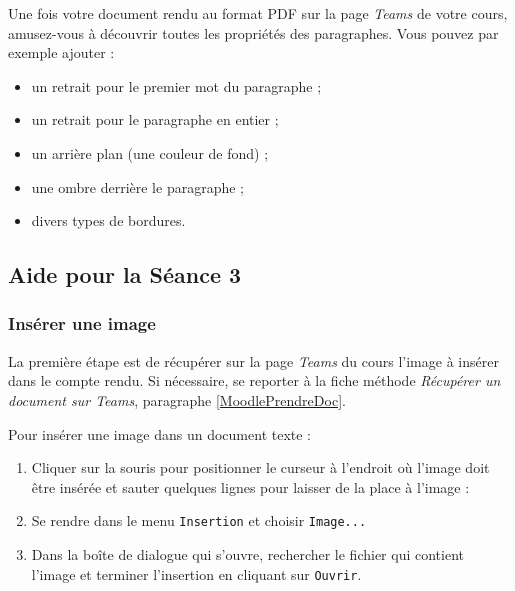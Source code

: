 {Une fois votre document rendu au format PDF sur la page \emph{Teams} de votre cours, amusez-vous à découvrir toutes les propriétés des paragraphes. Vous pouvez par exemple ajouter :
\begin{itemize}
\item un retrait pour le premier mot du paragraphe ;
\item un retrait pour le paragraphe en entier ; 
\item un arrière plan (une couleur de fond) ;
\item une ombre derrière le paragraphe ; 
\item divers types de bordures. 
\end{itemize}


%
%
%
%


\subsection{Aide pour la Séance 3}\label{correction_texte03}



\subsubsection{Insérer une image}

La première étape est de récupérer sur la page \emph{Teams} du cours l'image à insérer dans le compte rendu. Si nécessaire, se reporter à la fiche méthode \emph{Récupérer un document sur Teams}, paragraphe \vref{MoodlePrendreDoc}.

\vspace{12pt}

Pour insérer une image dans un document texte :

\begin{enumerate}
\item Cliquer sur la souris pour positionner le curseur à l'endroit où l'image doit être insérée et sauter quelques lignes pour laisser de la place à l'image :


\item Se rendre dans le menu \texttt{Insertion} et choisir \texttt{Image...}


\item Dans la boîte de dialogue qui s'ouvre, rechercher le fichier qui contient l'image et terminer l'insertion en cliquant sur \texttt{Ouvrir}.


\end{enumerate}}

